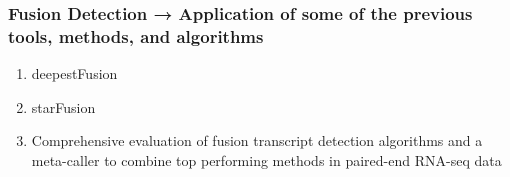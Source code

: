 \subsubsection{Fusion Detection → Application of some of the previous tools, methods, and algorithms}
\begin{enumerate}
    \item deepestFusion
    \item starFusion
    \item Comprehensive evaluation of fusion transcript detection algorithms and a meta-caller to combine top performing methods in paired-end RNA-seq data
\end{enumerate}


